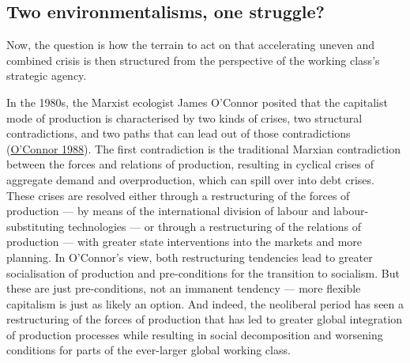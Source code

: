 \documentclass[a4paper, nobind]{templates/ociamthesis}
\begin{document}
\hypertarget{two-environmentalisms-one-struggle}{%
\subsection{Two environmentalisms, one struggle?}\label{two-environmentalisms-one-struggle}}

Now, the question is how the terrain to act on that accelerating uneven and combined crisis is then structured from the perspective of the working class's strategic agency.

In the 1980s, the Marxist ecologist James O'Connor posited that the capitalist mode of production is characterised by two kinds of crises, two structural contradictions, and two paths that can lead out of those contradictions (\protect\hyperlink{ref-oconnor_capitalism_1988}{O'Connor 1988}). The first contradiction is the traditional Marxian contradiction between the forces and relations of production, resulting in cyclical crises of aggregate demand and overproduction, which can spill over into debt crises. These crises are resolved either through a restructuring of the forces of production --- by means of the international division of labour and labour-substituting technologies --- or through a restructuring of the relations of production --- with greater state interventions into the markets and more planning. In O'Connor's view, both restructuring tendencies lead to greater socialisation of production and pre-conditions for the transition to socialism. But these are just pre-conditions, not an immanent tendency --- more flexible capitalism is just as likely an option. And indeed, the neoliberal period has seen a restructuring of the forces of production that has led to greater global integration of production processes while resulting in social decomposition and worsening conditions for parts of the ever-larger global working class.
\end{document}
